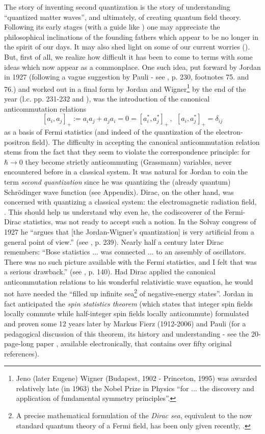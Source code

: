 \documentclass[12pt]{article}
\begin{document}
The story of inventing second quantization is the story of understanding 
``quantized matter waves'', and ultimately, of creating quantum field theory. 
Following its early stages (with a guide like \cite{Dar}) one may appreciate 
the philosophical inclinations of the founding fathers which appear to be no 
longer in the spirit of our days. It may also shed light on some of our current
 worries (\cite{S10}). But, first of all, we realize how difficult it has been 
to come to terms with some ideas which now appear as a commonplace. One such
idea, put forward by Jordan in 1927 (following a vague suggestion by Pauli - see
 \cite{Dar}, p. 230, footnotes 75. and 76.) and worked out in a final form by 
Jordan and Wigner\footnote{Jeno (later Eugene) Wigner (Budapest, 1902 - 
Princeton, 1995) was awarded relatively late (in 1963) the Nobel Prize in 
Physics ``for ... the discovery and application of fundamental symmetry 
principles''.} by the end of the year (l.c. pp. 231-232 and \cite{JW28}), was 
the introduction of the canonical anticommutation relations
\begin{equation}
\label{CAR}
[a_i, a_j]_+:= a_i a_j + a_j a_i=0 = [a_i^*, a_j^*]_+\,, \ \ [a_i, a_j^*]_+ = 
\delta_{ij}
\end{equation}
as a basis of Fermi statistics (and indeed of the quantization of the electron-positron field). The difficulty in accepting the canonical anticommutation relation stems from the fact that they seem to violate the correspondence principle: for $\hbar \rightarrow 0$ they become strictly anticommuting (Grassmann) variables, never encountered 
before in a classical system.  It was natural for Jordan to coin the term {\it second quantization} since he was quantizing the (already quantum) Schr\"odinger wave 
function (see Appendix). Dirac, on the other hand, was concerned with quantizing a classical system: the electromagnetic radiation field, \cite{D27}. This should help us understand why even he, the codiscoverer of the Fermi-Dirac statistics, was not ready to accept such a notion. In the Solvay congress of 1927 he ``argues  that [the Jordan-Wigner's quantization] is very artificial from a general point of view.'' (see \cite{Dar}, p. 239). Nearly half a century later Dirac remembers: ``Bose statistics ... was connected ... to an assembly of oscillators. There was no such picture available with the Fermi statistics, and I felt that was a serious drawback.'' 
(see \cite{D}, p. 140). Had Dirac applied the canonical anticommutation 
relations to his wonderful relativistic wave equation, he would not have needed
 the ``filled up infinite sea\footnote{A precise mathematical formulation of the
 {\it Dirac sea}, equivalent to the now standard quantum theory of a Fermi 
field, has been only given recently, \cite{D11}.} of negative-energy states''. 
Jordan in fact anticipated the {\it spin statistics theorem} (which states that
 integer spin fields locally commute while half-integer spin fields locally 
anticommute) formulated and proven some 12 years later by Markus Fierz 
(1912-2006) and Pauli (for a pedagogical discussion of this theorem, its history
 and understanding - see the 20-page-long paper \cite{DS}, available 
electronically, that contains over fifty original references).
\end{document}
